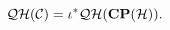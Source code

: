 \begin{equation}
{\cal QH}({\cal C}) = \iota^* {\cal QH}({\bf CP}({\cal H})).
\label{ppbbac}
\end{equation}

